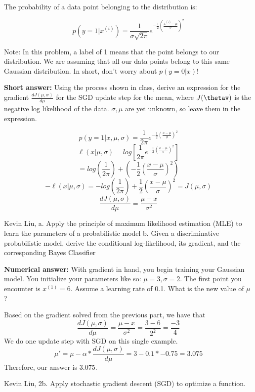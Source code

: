 \begin{parts}
The probability of a data point belonging to the distribution is:
\begin{center}
    \[p(y = 1 | x^{(i)}) = \frac{1}{\sigma \sqrt{2 \pi}} e^{-\frac{1}{2}(\frac{x^{(i)}-\mu}{\sigma})^2}\]
\end{center}
Note: In this problem, a label of 1 means that the point belongs to our distribution. We are assuming that all our data points belong to this same Gaussian distribution. In short, don't worry about $p(y=0 | x)$!
    \noaddpoints %
    \begin{subparts}
    \subpart[10] \textbf{Short answer:} Using the process shown in class, derive an expression for the gradient $\frac{d J(\mu, \sigma)}{d \mu}$ for the SGD update step for the mean, where $J(\thetav)$ is the negative log likelihood of the data. $\sigma, \mu$ are yet unknown, so leave them in the expression.
    \fillwithlines{2em}
    \begin{soln}
    \[p(y = 1 | x, \mu, \sigma) = \frac{1}{2 \pi} e^{-\frac{1}{2}(\frac{x-\mu}{\sigma})^2}\]
    \[\ell(x | \mu, \sigma) = log[\frac{1}{2 \pi} e^{-\frac{1}{2}(\frac{x-\mu}{\sigma})^2}]\]
    \[ = log(\frac{1}{2 \pi}) + (-\frac{1}{2}(\frac{x-\mu}{\sigma})^2)\]
    \[-\ell(x | \mu, \sigma) = -log(\frac{1}{2 \pi}) + \frac{1}{2}(\frac{x-\mu}{\sigma})^2 = J(\mu, \sigma)\]
    \[\frac{d J(\mu, \sigma)}{d \mu} = \frac{\mu - x}{\sigma^2}\]
    \end{soln}
    \begin{qauthor}
    Kevin Liu,
    a. Apply the principle of maximum likelihood estimation (MLE) to learn the parameters of a probabilistic model
    b. Given a discriminative probabilistic model, derive the conditional log-likelihood, its gradient, and the corresponding Bayes Classifier
    \end{qauthor} 
    \subpart[10] \textbf{Numerical answer:} With gradient in hand, you begin training your Gaussian model. You initialize your parameters like so: $\mu = 3, \sigma = 2$. The first point you encounter is $x^{(1)} = 6$. Assume a learning rate of 0.1. What is the new value of $\mu$?
    \begin{tcolorbox}[fit,height=1cm, width=2cm, blank, borderline={1pt}{-2pt}]
    \end{tcolorbox}
    \begin{soln}
    Based on the gradient solved from the previous part, we have that
    \[\frac{d J(\mu, \sigma)}{d \mu} = \frac{\mu - x}{\sigma^2} = \frac{3 - 6}{2 ^2} = \frac{-3}{4}\]
    We do one update step with SGD on this single example.
    \[\mu' = \mu - \alpha * \frac{d J(\mu, \sigma)}{d \mu} = 3 - 0.1 * -0.75 = 3.075 \]
    Therefore, our answer is 3.075.
    \end{soln}
    \begin{qauthor}
    Kevin Liu, 2b. Apply stochastic gradient descent (SGD) to optimize a function.
    \end{qauthor}
    \end{subparts}


\end{parts}
